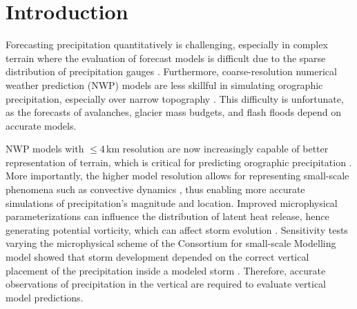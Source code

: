 \documentclass{ametsocV5}
\begin{document}







\section{Introduction}
    Forecasting precipitation quantitatively is challenging, especially in complex terrain where the evaluation of forecast models is difficult due to the sparse distribution of precipitation gauges \citep{barstad_evaluation_2005}. Furthermore, coarse-resolution numerical weather prediction (NWP) models are less skillful in simulating orographic precipitation, especially over narrow topography \citep{gowan_validation_2018}. This difficulty is unfortunate, as the forecasts of avalanches, glacier mass budgets, and flash floods depend on accurate models. 
	
	NWP models with $\leq$4\,km resolution are now increasingly capable of better representation of terrain, which is critical for predicting orographic precipitation \citep{colle_59_2000, colle_1314_2005, garvert_1314_2005, schwartz_reproducing_2014}. More importantly, the higher model resolution allows for representing small-scale phenomena such as convective dynamics \citep{gowan_validation_2018}, thus enabling more accurate simulations of precipitation's magnitude and location. Improved microphysical parameterizations can influence the distribution of latent heat release, hence generating potential vorticity, which can affect storm evolution \citep{joos_influence_2012}. Sensitivity tests varying the microphysical scheme of the Consortium for small-scale Modelling model showed that storm development depended on the correct vertical placement of the precipitation inside a modeled storm \citep{joos_influence_2012}. Therefore, accurate observations of precipitation in the vertical are required to evaluate vertical model predictions.
\end{document}
